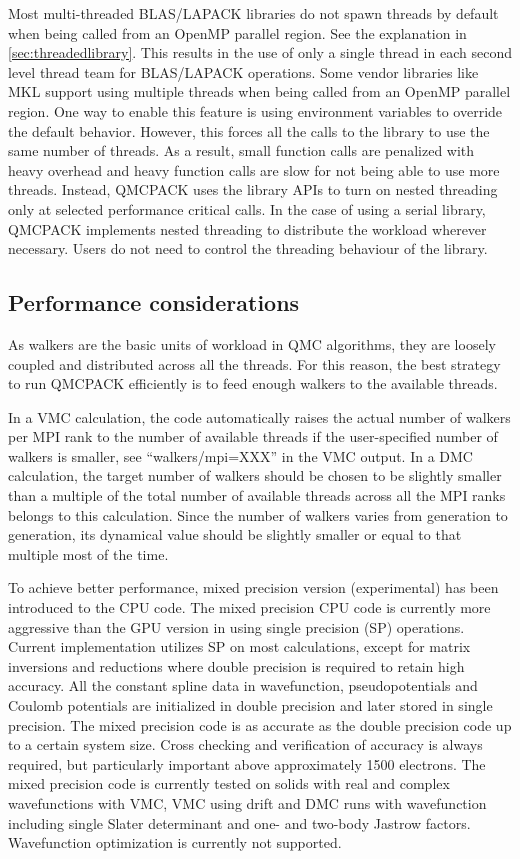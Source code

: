 Most multi-threaded BLAS/LAPACK libraries do not spawn threads by default
when being called from an OpenMP parallel region. See the explanation in \ref{sec:threadedlibrary}.
This results in the use of only a single thread in each second level thread team for BLAS/LAPACK operations.
Some vendor libraries like MKL support using multiple threads when being called from an OpenMP parallel region.
One way to enable this feature is using environment variables to override the default behavior.
However, this forces all the calls to the library to use the same number of threads.
As a result, small function calls are penalized with heavy overhead and heavy function calls are slow for not being able to use more threads.
Instead, QMCPACK uses the library APIs to turn on nested threading only at selected performance critical calls.
In the case of using a serial library, QMCPACK implements nested threading to distribute the workload wherever necessary.
Users do not need to control the threading behaviour of the library.

\subsection{Performance considerations}
\label{sec:cpu:performance}
As walkers are the basic units of workload in QMC algorithms, they are loosely coupled and distributed across all the threads. For this reason, the best strategy to run QMCPACK efficiently is to feed enough walkers to the available threads.

In a VMC calculation, the code automatically raises the actual number of walkers per MPI rank to the number of available threads if the user-specified number of walkers is smaller, see ``walkers/mpi=XXX'' in the VMC output.  In a DMC calculation, the target number of walkers should be chosen to be slightly smaller than a multiple of the total number of available threads across all the MPI ranks belongs to this calculation. Since the number of walkers varies from generation to generation, its dynamical value should be slightly smaller or equal to that multiple most of the time.

To achieve better performance, mixed precision version (experimental) has been introduced to the CPU code. The mixed precision CPU code is currently more aggressive than the GPU version in using single precision (SP) operations. Current implementation utilizes SP on most calculations, except for matrix inversions and reductions where double precision is required to retain high accuracy. All the constant spline data in wavefunction, pseudopotentials and Coulomb potentials are initialized in double precision and later stored in single precision. The mixed precision code is as accurate as the double precision code up to a certain system size. Cross checking and verification of accuracy is always required, but particularly important above approximately 1500 electrons. The mixed precision code is currently tested on solids with real and complex wavefunctions with VMC, VMC using drift and DMC runs with wavefunction including single Slater determinant and one- and two-body Jastrow factors. Wavefunction optimization is currently not supported.

